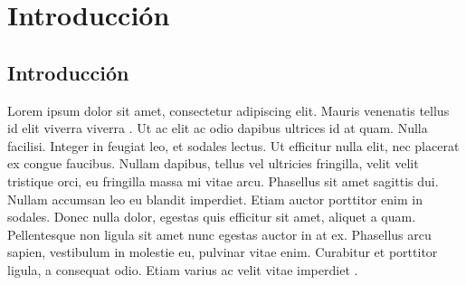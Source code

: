 \chapter{Introducción}

\section{Introducción}

Lorem ipsum dolor sit amet, consectetur adipiscing elit. Mauris venenatis tellus id elit viverra viverra \citep{adams1995hitchhiker}. Ut ac elit ac odio dapibus ultrices id at quam. Nulla facilisi. Integer in feugiat leo, et sodales lectus. Ut efficitur nulla elit, nec placerat ex congue faucibus. Nullam dapibus, tellus vel ultricies fringilla, velit velit tristique orci, eu fringilla massa mi vitae arcu. Phasellus sit amet sagittis dui. Nullam accumsan leo eu blandit imperdiet. Etiam auctor porttitor enim in sodales. Donec nulla dolor, egestas quis efficitur sit amet, aliquet a quam. Pellentesque non ligula sit amet nunc egestas auctor in at ex. Phasellus arcu sapien, vestibulum in molestie eu, pulvinar vitae enim. Curabitur et porttitor ligula, a consequat odio. Etiam varius ac velit vitae imperdiet \citep{Codishetal2000}.